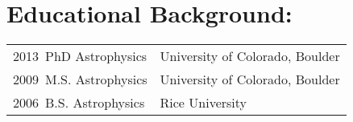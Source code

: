 \section*{Educational Background: }
\begin{tabular} {ll}
    2013~PhD Astrophysics & University of Colorado, Boulder \\
    2009~M.S. Astrophysics & University of Colorado, Boulder \\
    2006~B.S. Astrophysics & Rice University \\
\end{tabular}

